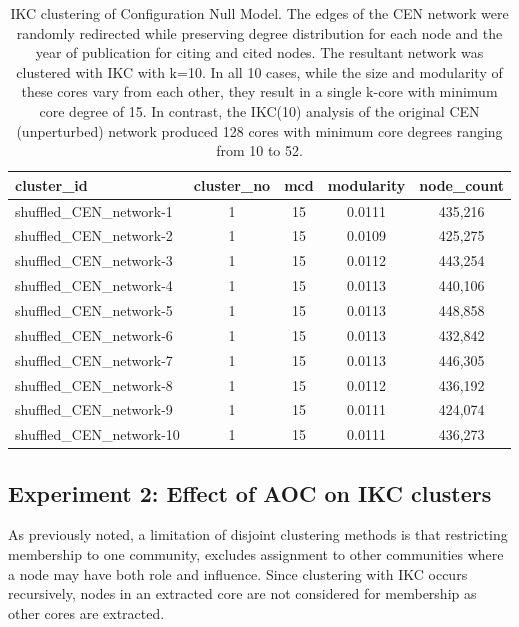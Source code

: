 \documentclass[12pt, oneside]{article}   	%
\begin{document}
\begin{table}[ht]
\centering
\captionsetup{width=0.9\textwidth}
\caption{IKC clustering of Configuration Null Model. The edges of the CEN network were randomly redirected while preserving degree distribution for each node and the year of publication for citing and cited nodes. 
The resultant network was clustered with IKC with k=10.  In all 10 cases, while the size and modularity of these cores vary from each other, they result in a single k-core with minimum core degree of 15. In contrast, the IKC(10) analysis of the original CEN (unperturbed) network produced 128 cores  with minimum core degrees ranging from 10 to 52.}
\begin{tabular}{lcccc}
  \hline
cluster\_id & cluster\_no & mcd & modularity & node\_count  \\ 
  \hline
shuffled\_CEN\_network-1 &     1 &    15 & 0.0111 & 435,216 \\
shuffled\_CEN\_network-2 &     1 &    15 & 0.0109 & 425,275 \\
shuffled\_CEN\_network-3 &     1 &    15 & 0.0112 & 443,254 \\
shuffled\_CEN\_network-4 &     1 &    15 & 0.0113 & 440,106 \\
shuffled\_CEN\_network-5 &     1 &    15 & 0.0113 & 448,858 \\
shuffled\_CEN\_network-6 &     1 &    15 & 0.0113 & 432,842 \\
shuffled\_CEN\_network-7 &     1 &    15 & 0.0113 & 446,305 \\
shuffled\_CEN\_network-8 &     1 &    15 & 0.0112 & 436,192 \\
shuffled\_CEN\_network-9 &     1 &    15 & 0.0111 & 424,074 \\
shuffled\_CEN\_network-10 &    1 &   15 & 0.0111 & 436,273 \\ 
   \hline
\end{tabular}
\label{tab:tab1}
\end{table}

\subsection{Experiment 2: Effect of AOC on IKC clusters} 
As previously noted, a limitation of disjoint clustering methods is that restricting membership to one community, excludes assignment to other communities where a node may have both role and influence. Since clustering with IKC occurs recursively, nodes in an extracted core are not considered for membership as other cores are extracted. 
\end{document}
